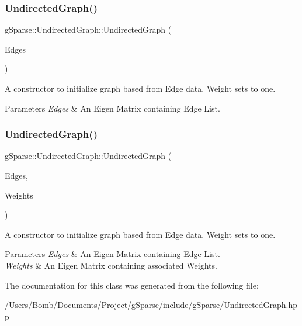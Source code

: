 \subsubsection{\texorpdfstring{Undirected\+Graph()}{UndirectedGraph()}\hspace{0.1cm}{\footnotesize\ttfamily [2/3]}}
{\footnotesize\ttfamily g\+Sparse\+::\+Undirected\+Graph\+::\+Undirected\+Graph (\begin{DoxyParamCaption}\item[{const g\+Sparse\+::\+Edge\+Matrix \&}]{Edges }\end{DoxyParamCaption})\hspace{0.3cm}{\ttfamily [inline]}}



A constructor to initialize graph based from Edge data. Weight sets to one. 


\begin{DoxyParams}{Parameters}
{\em Edges} & An Eigen Matrix containing Edge List. \\
\hline
\end{DoxyParams}
\mbox{\label{classg_sparse_1_1_undirected_graph_af9609f1e66af95a0bf201a1185394421}} 
\subsubsection{\texorpdfstring{Undirected\+Graph()}{UndirectedGraph()}\hspace{0.1cm}{\footnotesize\ttfamily [3/3]}}
{\footnotesize\ttfamily g\+Sparse\+::\+Undirected\+Graph\+::\+Undirected\+Graph (\begin{DoxyParamCaption}\item[{const g\+Sparse\+::\+Edge\+Matrix \&}]{Edges,  }\item[{const g\+Sparse\+::\+Precision\+Row\+Matrix \&}]{Weights }\end{DoxyParamCaption})\hspace{0.3cm}{\ttfamily [inline]}}



A constructor to initialize graph based from Edge data. Weight sets to one. 


\begin{DoxyParams}{Parameters}
{\em Edges} & An Eigen Matrix containing Edge List. \\
\hline
{\em Weights} & An Eigen Matrix containing associated Weights. \\
\hline
\end{DoxyParams}


The documentation for this class was generated from the following file\+:\begin{DoxyCompactItemize}
\item 
/\+Users/\+Bomb/\+Documents/\+Project/g\+Sparse/include/g\+Sparse/Undirected\+Graph.\+hpp\end{DoxyCompactItemize}
